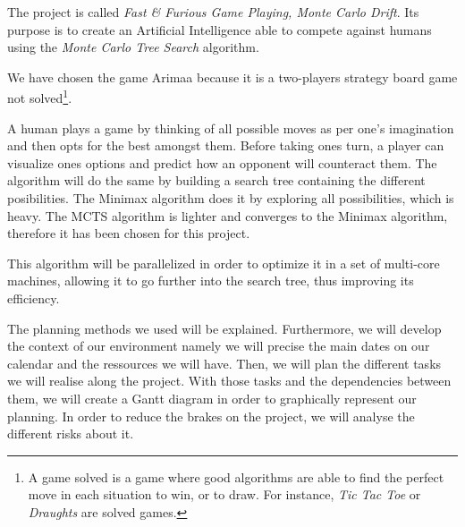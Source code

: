 The project is called \emph{Fast \& Furious Game Playing, Monte Carlo Drift}. Its purpose is to create an Artificial Intelligence able to compete against humans using the \emph{Monte Carlo Tree Search} algorithm.

We have chosen the game Arimaa because it is a two-players strategy board game not solved\footnote{A game solved is a game where good algorithms are able to find the perfect move in each situation to win, or to draw. For instance, \textit{Tic Tac Toe} or \textit{Draughts} are solved games.}.

A human plays a game by thinking of all possible moves as per one's imagination and then opts for the best amongst them. Before taking ones turn, a player can visualize ones options and predict how an opponent will counteract them. The algorithm will do the same by building a search tree containing the different posibilities. The Minimax algorithm does it by exploring all possibilities, which is heavy. The MCTS algorithm is lighter and converges to the Minimax algorithm, therefore it has been chosen for this project.

This algorithm will be parallelized in order to optimize it in a set of multi-core machines, allowing it to go further into the search tree, thus improving its efficiency.

The planning methods we used will be explained. Furthermore, we will develop the context of our environment namely we will precise the main dates on our calendar and the ressources we will have.  Then, we will plan the different tasks we will realise along the project. With those tasks and the dependencies between them, we will create a Gantt diagram in order to graphically represent our planning. In order to reduce the brakes on the project, we will analyse the different risks about it.
